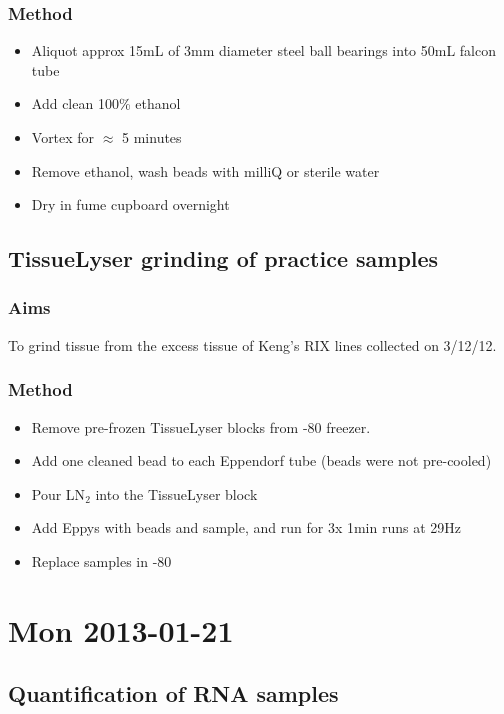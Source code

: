 \documentclass[12pt,a4paper]{book}
\begin{document}
    \subsection*{Method}
      \begin{itemize} \itemsep1pt \parskip0pt 
        \item Aliquot approx 15mL of 3mm diameter steel ball bearings into 50mL falcon tube
        \item Add clean 100\% ethanol
        \item Vortex for $\approx$ 5 minutes
        \item Remove ethanol, wash beads with milliQ or sterile water
        \item Dry in fume cupboard overnight
      \end{itemize}

  \section*{TissueLyser grinding of practice samples}
    \subsection*{Aims}
      To grind tissue from the excess tissue of Keng's RIX lines collected on 3/12/12.
    \subsection*{Method}
      \begin{itemize} \itemsep1pt \parskip0pt 
        \item Remove pre-frozen TissueLyser blocks from -80 freezer.
        \item Add one cleaned bead to each Eppendorf tube (beads were not pre-cooled)
        \item Pour LN$_2$ into the TissueLyser block
        \item Add Eppys with beads and sample, and run for 3x 1min runs at 29Hz
        \item Replace samples in -80
      \end{itemize}

\chapter*{Mon 2013-01-21}
  \section*{Quantification of RNA samples}
\end{document}
